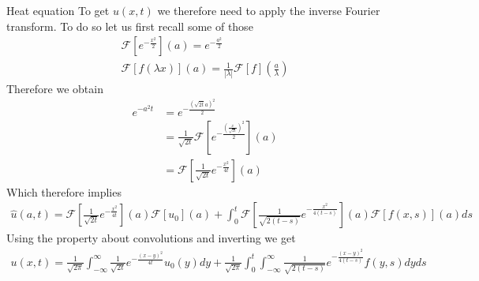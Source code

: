 \begin{parag}{Heat equation}
	To get $u\left(x, t\right)$ we therefore need to apply the inverse Fourier transform. To do so let us first recall some of those 
	\begin{align*} 
		\mathcal{F}\left[e^{-\frac{x^2}{2}}\right]\left(a\right) = e^{-\frac{a^2}{2}}\\
		\mathcal{F}\left[f\left(\lambda x\right)\right]\left(a\right) = \frac{1}{\left|\lambda\right|} \mathcal{F}\left[f\right]\left(\frac{a}{\lambda}\right)
	\end{align*}
	Therefore we obtain 
	\begin{align*} 
		e^{-a^2t}&= e^{- \frac{\left(\sqrt{2t}a\right)^2}{2}}\\
				&= \frac{1}{\sqrt{2t}}\mathcal{F}\left[e^{-\frac{\left(\frac{x}{\sqrt{2t}}\right)^2}{2}}\right]\left(a\right)\\
				&= \mathcal{F}\left[\frac{1}{\sqrt{2t}}e^{-\frac{x^2}{4t}}\right]\left(a\right)
	\end{align*}
	Which therefore implies 
	\begin{align*} 
		\hat{u}\left(a, t\right) = \mathcal{F}\left[\frac{1}{\sqrt{2t}}e^{-\frac{x^2}{4t}}\right]\left(a\right)\mathcal{F}\left[u_0\right]\left(a\right) + \int_0^{t}\mathcal{F}\left[\frac{1}{\sqrt{2\left(t-s\right)}}e^{-\frac{x^2}{4\left(t-s\right)}}\right]\left(a\right)\mathcal{F}\left[f\left(x, s\right)\right]\left(a\right)ds
	\end{align*}
	Using the property about convolutions and inverting we get 
	\begin{align*} 
		u\left(x, t\right) = \frac{1}{\sqrt{2\pi}}\int_{-\infty}^{\infty}\frac{1}{\sqrt{2t}}e^{-\frac{\left(x -y\right)^2}{4t}} u_0\left(y\right)dy + \frac{1}{\sqrt{2\pi}}\int_0^{t}\int_{-\infty}^{\infty}\frac{1}{\sqrt{2\left(t-s\right)}}e^{-\frac{\left(x-y\right)^2}{4\left(t-s\right)}} f\left(y, s\right)dyds
	\end{align*}
\end{parag}



